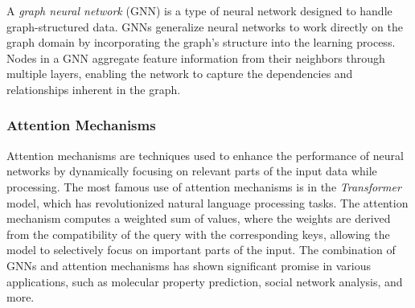 A \emph{graph neural network} (GNN) is a type of neural network designed to handle graph-structured data. GNNs generalize neural networks to work directly on the graph domain by incorporating the graph's structure into the learning process. Nodes in a GNN aggregate feature information from their neighbors through multiple layers, enabling the network to capture the dependencies and relationships inherent in the graph.



\subsubsection{Attention Mechanisms}
Attention mechanisms are techniques used to enhance the performance of neural networks by dynamically focusing on relevant parts of the input data while processing. The most famous use of attention mechanisms is in the \emph{Transformer} model, which has revolutionized natural language processing tasks. The attention mechanism computes a weighted sum of values, where the weights are derived from the compatibility of the query with the corresponding keys, allowing the model to selectively focus on important parts of the input.
The combination of GNNs and attention mechanisms has shown significant promise in various applications, such as molecular property prediction, social network analysis, and more.

